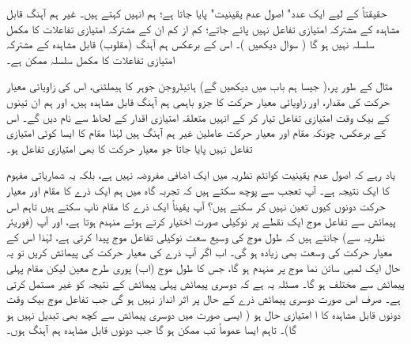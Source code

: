 حقیقتاً  کے لیے ایک عدد" اصول عدم یقینیت" پایا جاتا ہے؛ ہم انہیں  کہتے ہیں۔ غیر ہم آہنگ قابل مشاہدہ کے مشترکہ امتیازی تفاعل نہیں پائے جاتے؛ کم از کم ان کے مشترکہ امتیازی تفاعلات کا مکمل سلسلہ نہیں ہو گا ( سوال  دیکھیں )۔ اس کے برعکس ہم آہنگ (مقلوب) قابل مشاہدہ کے مشترکہ امتیازی تفاعلات کا مکمل سلسلہ ممکن ہے۔


مثال کے طور پر،( جیسا ہم باب  میں دیکھیں گے) ہائیڈروجن جوہر کا ہیملٹنی، اس کی زاویائی معیار حرکت کی مقدار، اور زاویائی معیار حرکت کا  جزو باہمی ہم آہنگ قابل مشاہدہ ہیں، اور ہم ان تینوں کے بیک وقت امتیازی تفاعل تیار کر کے انہیں متعلقہ امتیازی اقدار کے لحاظ سے نام دیں گے۔ اس کے برعکس، چونکہ مقام اور معیار حرکت عاملین غیر ہم آہنگ ہیں لہٰذا مقام کا ایسا کوئی امتیازی تفاعل نہیں پایا جاتا جو معیار حرکت کا بھی امتیازی تفاعل ہو۔

 یاد رہے کہ اصول عدم یقینیت کوانٹم نظریہ میں ایک اضافی مفروضہ نہیں ہے، بلکہ یہ شماریاتی مفہوم کا ایک نتیجہ ہے۔ آپ تعجب سے پوچھ سکتے ہیں کہ تجربہ گاہ میں ہم ایک ذرے کا مقام اور معیار حرکت دونوں کیوں تعین نہیں کر سکتے ہیں؟ آپ یقیناً ایک ذرے کا مقام ناپ سکتے ہیں تاہم اس پیمائش سے تفاعل موج ایک نقطے پر نوکیلی صورت اختیار کرتے ہوئے منہدم ہوتا ہے، اور آپ (فوریئر نظریہ سے) جانتے ہیں کہ طول موج کی وسیع سعت نوکیلی تفاعل موج پیدا کرتی ہے، لہٰذا اس کے معیار حرکت کی وسعت بھی زیادہ ہو گی۔ اب اگر آپ ذرے کی معیار حرکت کی پیمائش کریں تو یہ حال ایک لمبی سائن نما موج پر منہدم ہو گا، جس کا طول موج (اب) پوری طرح معین لیکن مقام پہلی پیمائش سے مختلف ہو گا۔ مسئلہ یہ ہے کہ دوسری پیمائش پہلی پیمائش کے نتیجہ کو غیر مستمل کرتی ہے۔ صرف اس صورت دوسری پیمائش ذرے کے حال پر اثر انداز نہیں ہو گی جب تفاعل موج بیک وقت دونوں قابل مشاہدہ کا ا امتیازی حال ہو ( ایسی صورت میں دوسری پیمائش سے کچھ بھی تبدیل نہیں ہو گا)۔ تاہم ایسا عموماً تب ممکن ہو گا جب دونوں قابل مشاہدہ ہم آہنگ ہوں۔
 
